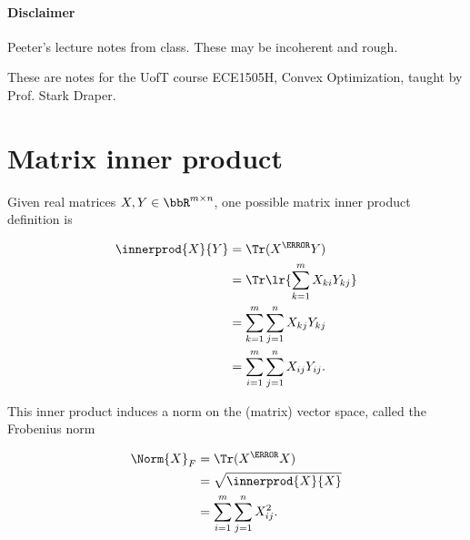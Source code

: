 
\renewcommand{\basename}{convexOptimization3}
\renewcommand{\dirname}{notes/ece1505/}
\newcommand{\keywords}{ECE1505H}


\usepackage{ece1505}
\usepackage{peeters_braket}
\usepackage{peeters_layout_exercise}
\usepackage{peeters_figures}
\usepackage{mathtools}
\usepackage{siunitx}
\usepackage{macros_cal}

\beginArtNoToc
{}
\label{chap:convexOptimization3}

\paragraph{Disclaimer}

Peeter's lecture notes from class.  These may be incoherent and rough.

These are notes for the UofT course ECE1505H, Convex Optimization, taught by Prof. Stark Draper.

\section{Matrix inner product}

Given real matrices \( X, Y \in \bbR^{m\times n} \), one possible matrix inner product definition is

\begin{dmath}\label{eqn:convexOptimizationLecture3:20}
\begin{aligned}
\innerprod{X}{Y}
&= \Tr( X^\T Y) \\
&= \Tr \lr{ \sum_{k = 1}^m X_{ki} Y_{kj} } \\
&= \sum_{k = 1}^m \sum_{j = 1}^n X_{kj} Y_{kj} \\
&= \sum_{i = 1}^m \sum_{j = 1}^n X_{ij} Y_{ij}.
\end{aligned}
\end{dmath}

This inner product induces a norm on the (matrix) vector space, called the Frobenius norm

\begin{dmath}\label{eqn:convexOptimizationLecture3:40}
\begin{aligned}
\Norm{X }_F
&= \Tr( X^\T X) \\
&= \sqrt{ \innerprod{X}{X} } \\
&=
\sum_{i = 1}^m \sum_{j = 1}^n X_{ij}^2.
\end{aligned}
\end{dmath}

